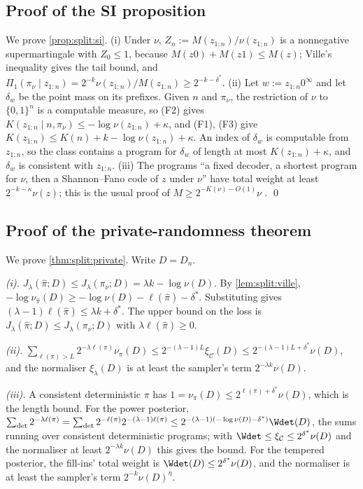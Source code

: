 \subsection{Proof of the SI proposition}\label{app:split:si}

We prove \cref{prop:split:si}. (i) Under $\nu$, $Z_n:=M(z_{1:n})/\nu(z_{1:n})$ is a nonnegative supermartingale with $Z_0\le1$, because $M(z0)+M(z1)\le M(z)$; Ville's inequality gives the tail bound, and $\Pi_1(\pi_\nu\mid z_{1:n})=2^{-k}\nu(z_{1:n})/M(z_{1:n})\ge2^{-k-\delta^*}$. (ii) Let $w:=z_{1:n}0^\infty$ and let $\delta_w$ be the point mass on its prefixes. Given $n$ and $\pi_\nu$, the restriction of $\nu$ to $\{0,1\}^n$ is a computable measure, so (F2) gives $K(z_{1:n}\mid n,\pi_\nu)\le-\log\nu(z_{1:n})+\kappa$, and (F1), (F3) give $K(z_{1:n})\le K(n)+k-\log\nu(z_{1:n})+\kappa$. An index of $\delta_w$ is computable from $z_{1:n}$, so the class contains a program for $\delta_w$ of length at most $K(z_{1:n})+\kappa$, and $\delta_w$ is consistent with $z_{1:n}$. (iii) The programs ``a fixed decoder, a shortest program for $\nu$, then a Shannon--Fano code of $z$ under $\nu$'' have total weight at least $2^{-k-\kappa}\nu(z)$; this is the usual proof of $M\ge2^{-K(\nu)-O(1)}\nu$ \citep{li2008introduction}. \qed

\subsection{Proof of the private-randomness theorem}\label{app:split:private}

We prove \cref{thm:split:private}. Write $D=D_n$.

\emph{(i).} $J_\lambda(\hat\pi;D)\le J_\lambda(\pi_\nu;D)=\lambda k-\log\nu(D)$. By \cref{lem:split:ville}, $-\log\nu_{\hat\pi}(D)\ge-\log\nu(D)-\ell(\hat\pi)-\delta^*$. Substituting gives $(\lambda-1)\ell(\hat\pi)\le\lambda k+\delta^*$. The upper bound on the loss is $J_\lambda(\hat\pi;D)\le J_\lambda(\pi_\nu;D)$ with $\lambda\ell(\hat\pi)\ge0$.

\emph{(ii).} $\sum_{\ell(\pi)>L}2^{-\lambda\ell(\pi)}\nu_\pi(D)\le2^{-(\lambda-1)L}\xi_{\mathcal C}(D)\le2^{-(\lambda-1)L+\delta^*}\nu(D)$, and the normaliser $\xi_\lambda(D)$ is at least the sampler's term $2^{-\lambda k}\nu(D)$.

\emph{(iii).} A consistent deterministic $\pi$ has $1=\nu_\pi(D)\le2^{\ell(\pi)+\delta^*}\nu(D)$, which is the length bound. For the power posterior, $\sum_{\det}2^{-\lambda\ell(\pi)}=\sum_{\det}2^{-\ell(\pi)}2^{-(\lambda-1)\ell(\pi)}\le2^{-(\lambda-1)(-\log\nu(D)-\delta^*)}\Wdet(D)$, the sums running over consistent deterministic programs; with $\Wdet\le\xi_{\mathcal C}\le2^{\delta^*}\nu(D)$ and the normaliser at least $2^{-\lambda k}\nu(D)$ this gives the bound. For the tempered posterior, the fill-ins' total weight is $\Wdet(D)\le2^{\delta^*}\nu(D)$, and the normaliser is at least the sampler's term $2^{-k}\nu(D)^\eta$.

